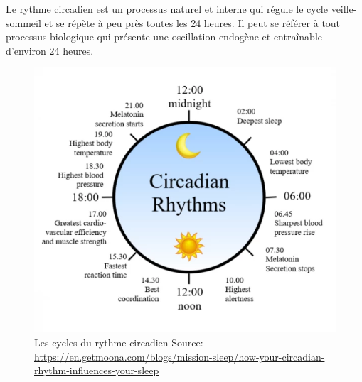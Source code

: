 




Le rythme circadien est un processus naturel et interne qui régule le cycle
veille-sommeil et se répète à peu près toutes les 24 heures.
Il peut se référer à tout processus biologique qui présente une oscillation
endogène et entraînable d'environ 24 heures.

\begin{figure}
  \centering
  \includegraphics[scale=1.80]{media/circadien.png}
  \caption{
      Les cycles du rythme circadien\newline
      \tiny{Source: \url{https://en.getmoona.com/blogs/mission-sleep/how-your-circadian-rhythm-influences-your-sleep}}
  }
\end{figure}

